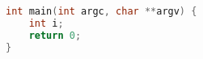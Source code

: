 \documentclass[UTF-8]{ctexart}
\begin{document}


\begin{lstlisting}[language=C]
int main(int argc, char **argv) {
    int i;
    return 0;
}
\end{lstlisting}


\end{document}
